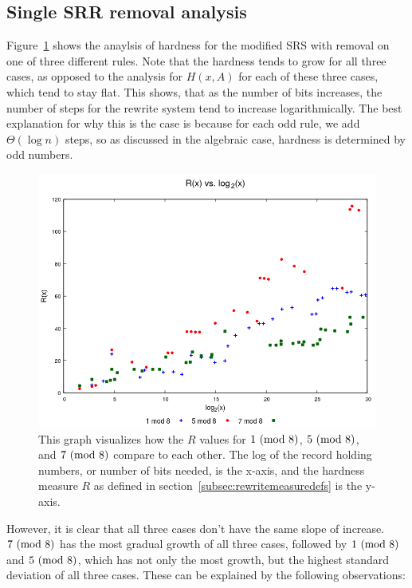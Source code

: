 \subsection{Single SRR removal analysis} \label{subsec:rewritehardness}
Figure~\ref{fig:rvslog} shows the anaylsis of hardness for the modified SRS with removal on one of three different rules. Note that the hardness tends to grow for all three cases, as opposed to the analysis for $H(x,A)$ for each of these three cases, which tend to stay flat. This shows, that as the number of bits increases, the number of steps for the rewrite system tend to increase logarithmically. The best explanation for why this is the case is because for each odd rule, we add $\Theta(\log{n})$ steps, so as discussed in the algebraic case, hardness is determined by odd numbers.
\begin{figure}
    \centering
    \includegraphics[scale=0.75]{ModAvoidanceAnalysisPics/R_vs_log.png}
    \caption{This graph visualizes how the $R$ values for $1 \ (\mathrm{mod}\ 8)$, $5 \ (\mathrm{mod}\ 8)$, and $7 \ (\mathrm{mod}\ 8)$ compare to each other. The log of the record holding numbers, or number of bits needed, is the x-axis, and the hardness measure $R$ as defined in section~\ref{subsec:rewritemeasuredefs} is the y-axis.}
    \label{fig:rvslog}
\end{figure}
However, it is clear that all three cases don't have the same slope of increase. $7 \ (\mathrm{mod}\ 8)$ has the most gradual growth of all three cases, followed by $1 \ (\mathrm{mod}\ 8)$ and $5 \ (\mathrm{mod}\ 8)$, which has not only the most growth, but the highest standard deviation of all three cases. These can be explained by the following observations:
